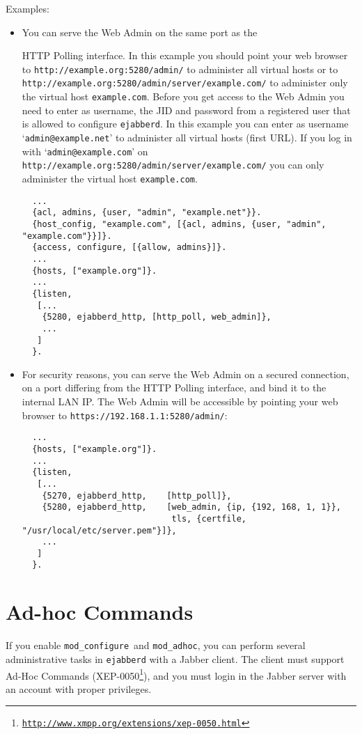 \documentclass[a4paper,10pt]{book}
\newcommand{\ind}[1]{\begin{latexonly}\index{#1}\end{latexonly}}
\newcommand{\jid}[1]{\texttt{#1}}
\newcommand{\ejabberd}{\texttt{ejabberd}}
\newcommand{\module}[1]{\texttt{#1}}
\newcommand{\modadhoc}{\module{mod\_adhoc}}
\newcommand{\modconfigure}{\module{mod\_configure}}
\gdef\footahref#1#2{#2\footnote{\href{#1}{\texttt{#1}}}}
\newcommand{\txepref}[2]{\footahref{http://www.xmpp.org/extensions/xep-#1.html}{#2}}
\newcommand{\xepref}[1]{\txepref{#1}{XEP-#1}}
\begin{document}
Examples:
\begin{itemize}
\item You can serve the Web Admin on the same port as the
  \ind{protocols!XEP-0025: HTTP Polling}HTTP Polling interface. In this example
  you should point your web browser to \verb|http://example.org:5280/admin/| to
  administer all virtual hosts or to
  \verb|http://example.org:5280/admin/server/example.com/| to administer only
  the virtual host \jid{example.com}. Before you get access to the Web Admin
  you need to enter as username, the JID and password from a registered user
  that is allowed to configure \ejabberd{}. In this example you can enter as
  username `\jid{admin@example.net}' to administer all virtual hosts (first
  URL). If you log in with `\jid{admin@example.com}' on \\
  \verb|http://example.org:5280/admin/server/example.com/| you can only
  administer the virtual host \jid{example.com}.
  \begin{verbatim}
  ...
  {acl, admins, {user, "admin", "example.net"}}.
  {host_config, "example.com", [{acl, admins, {user, "admin", "example.com"}}]}.
  {access, configure, [{allow, admins}]}.
  ...
  {hosts, ["example.org"]}.
  ...
  {listen,
   [...
    {5280, ejabberd_http, [http_poll, web_admin]},
    ...
   ]
  }.
\end{verbatim}
\item For security reasons, you can serve the Web Admin on a secured
  connection, on a port differing from the HTTP Polling interface, and bind it
  to the internal LAN IP. The Web Admin will be accessible by pointing your
  web browser to \verb|https://192.168.1.1:5280/admin/|:
  \begin{verbatim}
  ...
  {hosts, ["example.org"]}.
  ...
  {listen,
   [...
    {5270, ejabberd_http,    [http_poll]},
    {5280, ejabberd_http,    [web_admin, {ip, {192, 168, 1, 1}},
                              tls, {certfile, "/usr/local/etc/server.pem"}]},
    ...
   ]
  }.
\end{verbatim}
\end{itemize}


\section{Ad-hoc Commands}
\label{adhoccommands}

If you enable \modconfigure\ and \modadhoc,
you can perform several administrative tasks in \ejabberd{}
with a Jabber client.
The client must support Ad-Hoc Commands (\xepref{0050}),
and you must login in the Jabber server with
an account with proper privileges.
\end{document}
